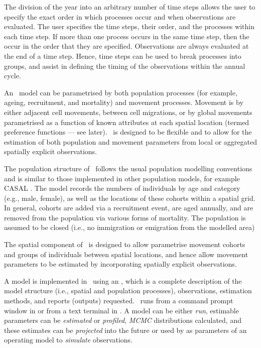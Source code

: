 The division of the year into an arbitrary number of time steps allows the user to specify the exact order in which processes occur and when observations are evaluated. The user specifies the time steps, their order, and the processes within each time step. If more than one process occurs in the same time step, then the occur in the order that they are specified. Observations are always evaluated at the end of a time step. Hence, time steps can be used to break processes into groups, and assist in defining the timing of the observations within the annual cycle. 

An \SPM\ model can be parametrised by both population processes (for example, ageing, recruitment, and mortality) and movement processes. Movement is by either adjacent cell movements, between cell migrations, or by global movements parametrised as a function of known attributes at each spatial location (termed preference functions --- see later). \SPM\ is designed to be flexible and to allow for the estimation of both population and movement parameters from local or aggregated spatially explicit observations. 

The population structure of \SPM\ follows the usual population modelling conventions and is similar to those implemented in other population models, for example CASAL  \citep{1388}. The model records the numbers of individuals by age and category (e.g., male, female), as well as the locations of these cohorts within a spatial grid. In general, cohorts are added via a recruitment event, are aged annually, and are removed from the population via various forms of mortality. The population is assumed to be closed (i.e., no immigration or emigration from the modelled area)

The spatial component of \SPM\ is designed to allow parametrise movement cohorts and groups of individuals between spatial locations, and hence allow movement parameters to be estimated by incorporating spatially explicit observations. 

A model is implemented in \SPM\ using an \config {}, which is a complete description of the model structure (i.e., spatial and population processes), observations, estimation methods, and reports (outputs) requested. \SPM\ runs from a command prompt window in  or from a text terminal in . A model can be either \emph{run}, estimable parameters can be \emph{estimated} or \emph{profiled}, \emph{MCMC} distributions calculated, and these estimates can be \emph{projected} into the future or used by \SPM as parameters of an operating model to \emph{simulate} observations.

